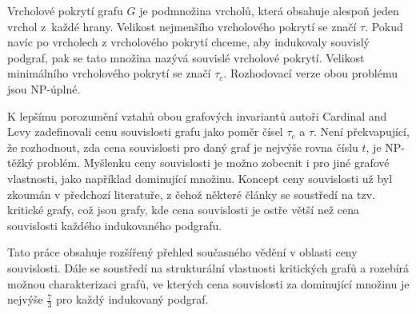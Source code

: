 \documentclass[12pt]{report}
\begin{document}
Vrcholové pokrytí grafu \(G\) je podmnožina vrcholů, která obsahuje
alespoň jeden vrchol z~každé hrany.  Velikost nejmenšího vrcholového
pokrytí se značí \(\tau\). Pokud navíc po vrcholech z vrcholového
pokrytí chceme, aby indukovaly souvislý podgraf, pak se tato množina
nazývá souvislé vrcholové pokrytí. Velikost minimálního vrcholového
pokrytí se značí \(\tau_c\).  Rozhodovací verze obou problému jsou
NP-úplné.

K lepšímu porozumění vztahů obou grafových invariantů autoři Cardinal
and Levy zadefinovali cenu souvislosti grafu jako poměr čísel
\(\tau_c\) a \(\tau\). Není překvapující, že rozhodnout, zda cena
souvislosti pro daný graf je nejvýše rovna číslu \(t\), je NP-těžký
problém.  Myšlenku ceny souvislosti je možno zobecnit i pro jiné
grafové vlastnosti, jako například dominující množinu. Koncept ceny
souvislosti už byl zkoumán v předchozí literatuře, z čehož některé
články se soustředí na tzv. kritické grafy, což jsou grafy, kde cena
souvislosti je ostře větší než cena souvislosti každého indukovaného
podgrafu.

Tato práce obsahuje rozšířený přehled současného vědění v oblasti ceny
souvislosti.  Dále se soustředí na strukturální vlastnosti kritických
grafů a rozebírá možnou charakterizaci grafů, ve kterých cena
souvislosti za dominující množinu je nejvýše $\frac{7}{3}$ pro každý
indukovaný podgraf.
\end{document}
